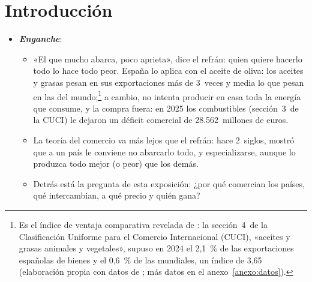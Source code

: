 \documentclass[11pt]{article}
\begin{document}
\tceetitulo

\section*{Introducción}

\begin{itemize}
\item \textbf{\emph{Enganche}}:
  \begin{itemize}
  \item «El que mucho abarca, poco aprieta», dice el refrán: quien quiere hacerlo todo lo hace todo peor. España lo aplica con el aceite de oliva: los aceites y grasas pesan en sus exportaciones más de 3~veces y media lo que pesan en las del mundo\nocite{UNComtrade2026};\footnote{Es el índice de ventaja comparativa revelada de \textcite{Balassa1965Trade}: la sección~4~de la Clasificación Uniforme para el Comercio Internacional (CUCI), «aceites y grasas animales y vegetales», supuso en 2024 el 2,1~\% de las exportaciones españolas de bienes y el 0,6~\% de las mundiales, un índice de 3,65 (elaboración propia con datos de \textcite{UNComtrade2026}; más datos en el anexo~\ref{anexo:datos}).} a cambio, no intenta producir en casa toda la energía que consume, y la compra fuera: en 2025 los combustibles (sección~3~de la CUCI) le dejaron un déficit comercial de 28.562~millones de euros\nocite{Datacomex2026}.
  \item La teoría del comercio va más lejos que el refrán: hace 2~siglos,  mostró que a un país le conviene no abarcarlo todo, y especializarse, aunque lo produzca todo mejor (o peor) que los demás.
  \item Detrás está la pregunta de esta exposición: ¿por qué comercian los países, qué intercambian, a qué precio y quién gana?
  \end{itemize}



\end{itemize}
\end{document}
